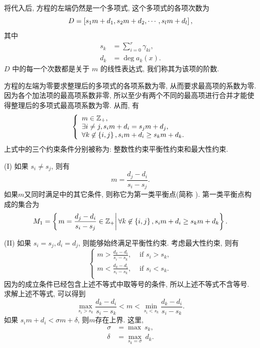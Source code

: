 将代入后, 方程的左端仍然是一个多项式, 这个多项式的各项次数为
\begin{equation}
D = \left[s_1 m+d_1,s_2 m+d_2,\cdots,s_l m+d_l\right],
\end{equation}
其中
\begin{equation}
\begin{split}
s_k&=\sum_{i=0}^r{\gamma_{ki}}, \\
d_k&=\deg a_k(x).
\end{split}
\label{eq-sd}
\end{equation}
$D$ 中的每一个次数都是关于 $m$ 的线性表达式, 我们称其为该项的阶数.

方程的左端为零要求整理后的多项式的各项系数为零, 从而要求最高项的系数为零. 因为各个加法项的最高项系数非零, 所以至少有两个不同的最高项进行合并才能使得整理后的多项式最高项系数为零. 从而, 有 
\begin{equation}
\left\{
\begin{array}{l}
m\in \mathbb Z_+  ,                                     \\
\exists i\neq j, s_i m+d_i=s_j m+d_j    ,               \\
\forall k \not\in \left\{i,j\right\}, s_i m+d_i\ge s_k m+d_k .
\end{array}
\right.
\label{cond}
\end{equation}
上式中的三个约束条件分别被称为: 整数性约束\D 平衡性约束和最大性约束. 

(I) 如果 $s_i \neq s_j$, 则有 
\begin{equation}
m=\frac{d_j-d_i}{s_i-s_j}.
\end{equation}
如果$m$又同时满足中的其它条件, 则称它为第一类平衡点(简称 \BPone{}). 第一类平衡点构成的集合为 
\begin{equation}
M_1=\left\{\left. m=\frac{d_j-d_i}{s_i-s_j}\in \mathbb Z_+\right\vert \forall k\not\in \left\{i,j\right\}, s_i m+d_i\ge s_k m+d_k\right\}.
\end{equation}

(II) 如果 $s_i = s_j, d_i=d_j$, 则能够始终满足平衡性约束. 考虑最大性约束, 则有 
\begin{equation}
\left\{
\begin{split}
m > \frac{d_k-d_i}{s_i-s_k}, & \text{ if } s_i>s_k,  \\
m < \frac{d_k-d_i}{s_i-s_k}, & \text{ if } s_i<s_k.  \\
\end{split}
\right.
\end{equation}
因为\BPone{}的成立条件已经包含上述不等式中取等号的条件, 所以上述不等式不含等号. 求解上述不等式, 可以得到 
\begin{equation}
\underset{s_i>s_k}{\max}{\frac{d_k-d_i}{s_i-s_k}} < m < \underset{s_i<s_k}{\min}{\frac{d_k-d_i}{s_i-s_k}}.
\end{equation}
如果 $s_i m + d_i < \sigma m + \delta$, 则$m$存在上界. 这里, 
\begin{equation}
\begin{split}
\sigma &= \max ~s_k,  \\
\delta &= \underset{s_k=\sigma}{\max}{~d_k}.
\end{split}
\label{eq-max-sd}
\end{equation}

